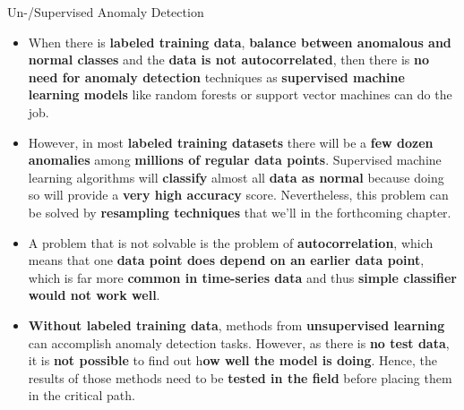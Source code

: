 \documentclass[document.tex]{subfiles}
\begin{document}
    \begin{frame}{Un-/Supervised Anomaly Detection}
        \begin{itemize}
        \item When there is \textbf{labeled training data}, \textbf{balance between anomalous and normal classes} and the \textbf{data is not autocorrelated}, then there is \textbf{no need for anomaly detection} techniques as \textbf{supervised machine learning models} like random forests or support vector machines can do the job.
        \item However, in most \textbf{labeled training datasets} there will be a \textbf{few dozen anomalies} among \textbf{millions of regular data points}. Supervised machine learning algorithms will \textbf{classify} almost all \textbf{data as normal} because doing so will provide a \textbf{very high accuracy} score. Nevertheless, this problem can be solved by \textbf{resampling techniques} that we'll in the forthcoming chapter.
        \item A problem that is not solvable is the problem of \textbf{autocorrelation}, which means that one \textbf{data point does depend on an earlier data point}, which is far more \textbf{common in time-series data} and thus \textbf{simple classifier would not work well}.
        \item \textbf{Without labeled training data}, methods from \textbf{unsupervised learning} can accomplish anomaly detection tasks. However, as there is \textbf{no test data}, it is \textbf{not possible} to find out h\textbf{ow well the model is doing}. Hence, the results of those methods need to be \textbf{tested in the field} before placing them in the critical path.
        \end{itemize}
    \end{frame}
    
\end{document}
